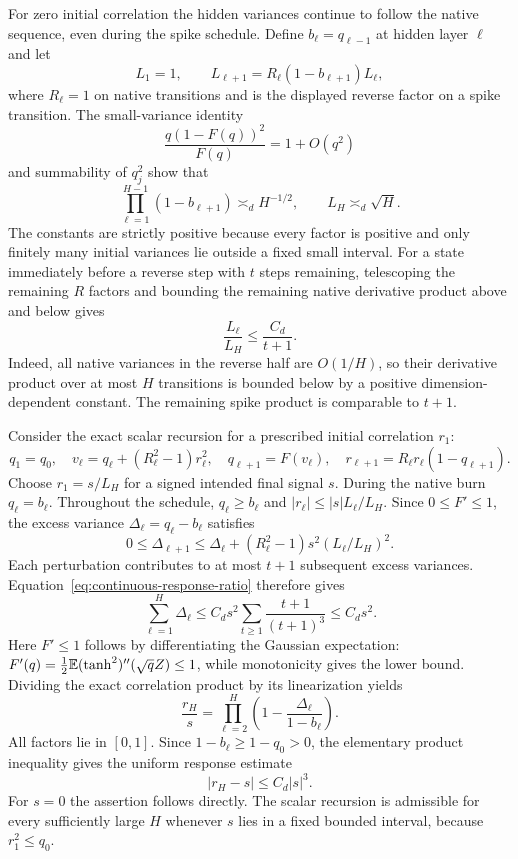 For zero initial correlation the hidden variances continue to follow the native sequence, even during the spike schedule. Define $b_\ell=q_{\ell-1}$ at hidden layer $\ell$ and let
\[
 L_1=1,\qquad L_{\ell+1}=R_\ell(1-b_{\ell+1})L_\ell,
\]
where $R_\ell=1$ on native transitions and is the displayed reverse factor on a spike transition. The small-variance identity
\[
 \frac{q(1-F(q))^2}{F(q)}=1+O(q^2)
\]
and summability of $q_j^2$ show that
\[
 \prod_{\ell=1}^{H-1}(1-b_{\ell+1})\asymp_d H^{-1/2},
 \qquad L_H\asymp_d\sqrt H.
\]
The constants are strictly positive because every factor is positive and only finitely many initial variances lie outside a fixed small interval. For a state immediately before a reverse step with $t$ steps remaining, telescoping the remaining $R$ factors and bounding the remaining native derivative product above and below gives
\begin{equation}
 \frac{L_\ell}{L_H}\le\frac{C_d}{t+1}.
 \label{eq:continuous-response-ratio}
\end{equation}
Indeed, all native variances in the reverse half are $O(1/H)$, so their derivative product over at most $H$ transitions is bounded below by a positive dimension-dependent constant. The remaining spike product is comparable to $t+1$.

Consider the exact scalar recursion for a prescribed initial correlation $r_1$:
\[
 q_1=q_0,\quad
 v_\ell=q_\ell+(R_\ell^2-1)r_\ell^2,\quad
 q_{\ell+1}=F(v_\ell),\quad
 r_{\ell+1}=R_\ell r_\ell(1-q_{\ell+1}).
\]
Choose $r_1=s/L_H$ for a signed intended final signal $s$. During the native burn $q_\ell=b_\ell$. Throughout the schedule, $q_\ell\ge b_\ell$ and $|r_\ell|\le |s|L_\ell/L_H$. Since $0\le F'\le1$, the excess variance $\Delta_\ell=q_\ell-b_\ell$ satisfies
\[
 0\le\Delta_{\ell+1}\le\Delta_\ell+
             (R_\ell^2-1)s^2(L_\ell/L_H)^2.
\]
Each perturbation contributes to at most $t+1$ subsequent excess variances. Equation~\eqref{eq:continuous-response-ratio} therefore gives
\[
 \sum_{\ell=1}^H\Delta_\ell
 \le C_ds^2\sum_{t\ge1}\frac{t+1}{(t+1)^3}
 \le C_ds^2.
\]
Here $F'\le1$ follows by differentiating the Gaussian expectation: $F'(q)=\frac12\mathbb E(\tanh^2)''(\sqrt qZ)\le1$, while monotonicity gives the lower bound. Dividing the exact correlation product by its linearization yields
\[
 \frac{r_H}{s}=\prod_{\ell=2}^H
       \left(1-\frac{\Delta_\ell}{1-b_\ell}\right).
\]
All factors lie in $[0,1]$. Since $1-b_\ell\ge1-q_0>0$, the elementary product inequality gives the uniform response estimate
\begin{equation}
 |r_H-s|\le C_d|s|^3.
 \label{eq:continuous-cubic-response}
\end{equation}
For $s=0$ the assertion follows directly. The scalar recursion is admissible for every sufficiently large $H$ whenever $s$ lies in a fixed bounded interval, because $r_1^2\le q_0$.

